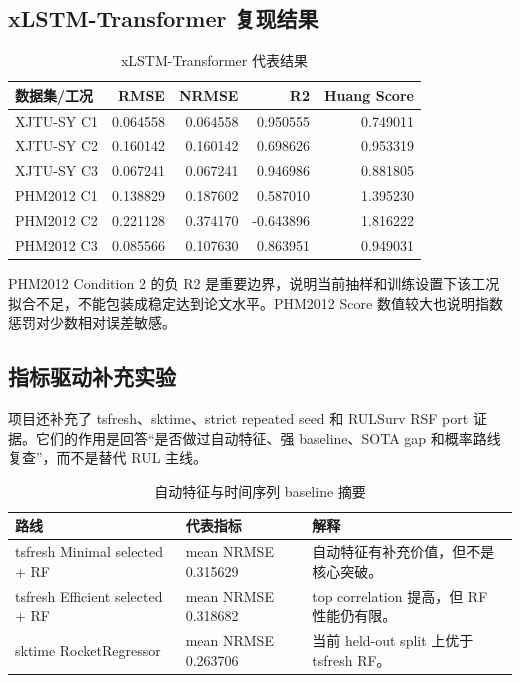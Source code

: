 \documentclass[UTF8,a4paper,12pt]{ctexart}
\begin{document}
\subsection{xLSTM-Transformer 复现结果}

\begin{table}[H]
\centering
\caption{xLSTM-Transformer 代表结果}
\begin{tabularx}{\textwidth}{p{3.2cm}r r r r}
\toprule
数据集/工况 & RMSE & NRMSE & R2 & Huang Score \\
\midrule
XJTU-SY C1 & 0.064558 & 0.064558 & 0.950555 & 0.749011 \\
XJTU-SY C2 & 0.160142 & 0.160142 & 0.698626 & 0.953319 \\
XJTU-SY C3 & 0.067241 & 0.067241 & 0.946986 & 0.881805 \\
PHM2012 C1 & 0.138829 & 0.187602 & 0.587010 & 1.395230 \\
PHM2012 C2 & 0.221128 & 0.374170 & -0.643896 & 1.816222 \\
PHM2012 C3 & 0.085566 & 0.107630 & 0.863951 & 0.949031 \\
\bottomrule
\end{tabularx}
\end{table}

PHM2012 Condition 2 的负 R2 是重要边界，说明当前抽样和训练设置下该工况拟合不足，不能包装成稳定达到论文水平。PHM2012 Score 数值较大也说明指数惩罚对少数相对误差敏感。

\subsection{指标驱动补充实验}

项目还补充了 tsfresh、sktime、strict repeated seed 和 RULSurv RSF port 证据。它们的作用是回答“是否做过自动特征、强 baseline、SOTA gap 和概率路线复查”，而不是替代 RUL 主线。

\begin{table}[H]
\centering
\caption{自动特征与时间序列 baseline 摘要}
\begin{tabularx}{\textwidth}{p{4.8cm}p{3.4cm}Y}
\toprule
路线 & 代表指标 & 解释 \\
\midrule
tsfresh Minimal selected + RF & mean NRMSE 0.315629 & 自动特征有补充价值，但不是核心突破。 \\
tsfresh Efficient selected + RF & mean NRMSE 0.318682 & top correlation 提高，但 RF 性能仍有限。 \\
sktime RocketRegressor & mean NRMSE 0.263706 & 当前 held-out split 上优于 tsfresh RF。 \\
\bottomrule
\end{tabularx}
\end{table}
\end{document}

